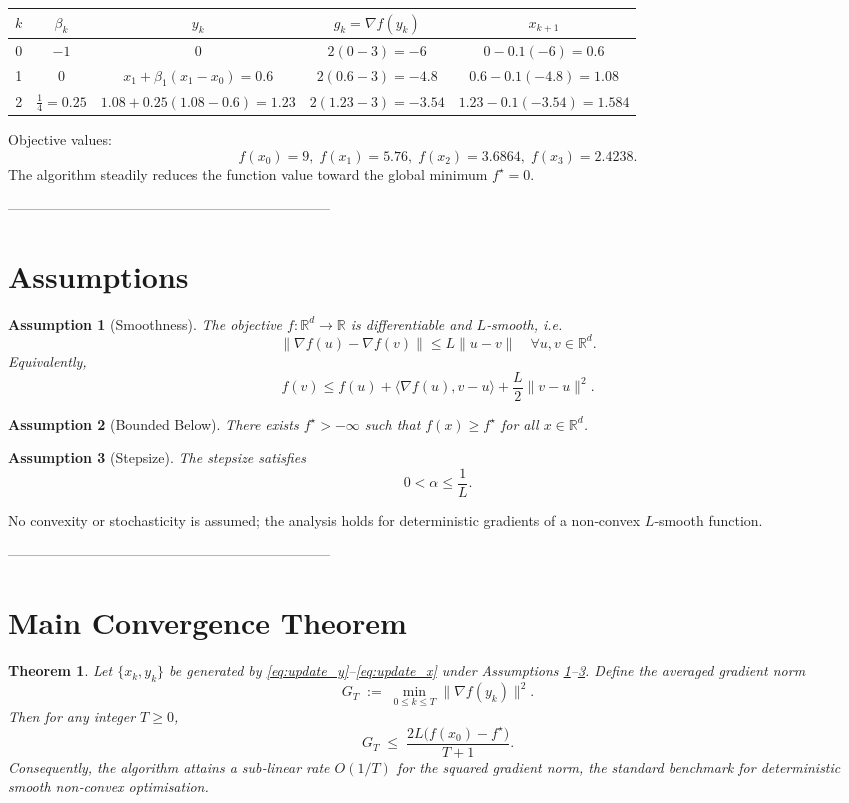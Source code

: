 \documentclass{article}
\newtheorem{theorem}{Theorem}
\newtheorem{assumption}{Assumption}
\newcommand{\grad}{\nabla}
\newcommand{\R}{\mathbb{R}}
\begin{document}
\begin{center}
\begin{tabular}{c|c|c|c|c}
$k$ & $\beta_k$ & $y_k$ & $g_k=\grad f(y_k)$ & $x_{k+1}$ \\ \hline
0 & $-1$ & $0$ & $2(0-3)=-6$ & $0-0.1(-6)=0.6$ \\[4pt]
1 & $0$ & $x_1+\beta_1(x_1-x_0)=0.6$ & $2(0.6-3)=-4.8$ & $0.6-0.1(-4.8)=1.08$ \\[4pt]
2 & $\frac{1}{4}=0.25$ & $1.08+0.25(1.08-0.6)=1.23$ & $2(1.23-3)=-3.54$ & $1.23-0.1(-3.54)=1.584$ 
\end{tabular}
\end{center}

Objective values:
\[
f(x_0)=9,\; f(x_1)=5.76,\; f(x_2)=3.6864,\; f(x_3)=2.4238.
\]
The algorithm steadily reduces the function value toward the global minimum $f^\star=0$.

---------------------------------------------------------------------

\section*{Assumptions}
\begin{assumption}[Smoothness]\label{ass:smooth}
The objective $f:\R^d\to\R$ is differentiable and $L$‑smooth, i.e.
\[
\|\grad f(u)-\grad f(v)\|\le L\|u-v\|\quad\forall u,v\in\R^d.
\]
Equivalently,
\[
f(v)\le f(u)+\langle\grad f(u),v-u\rangle+\frac{L}{2}\|v-u\|^2.
\tag{S}
\]
\end{assumption}

\begin{assumption}[Bounded Below]\label{ass:lower}
There exists $f^\star>-\infty$ such that $f(x)\ge f^\star$ for all $x\in\R^d$.
\end{assumption}

\begin{assumption}[Stepsize]\label{ass:stepsize}
The stepsize satisfies
\[
0<\alpha\le \frac{1}{L}.
\]
\end{assumption}

No convexity or stochasticity is assumed; the analysis holds for deterministic gradients of a non‑convex $L$‑smooth function.

---------------------------------------------------------------------

\section*{Main Convergence Theorem}
\begin{theorem}\label{thm:main}
Let $\{x_k,y_k\}$ be generated by \eqref{eq:update_y}–\eqref{eq:update_x} under Assumptions \ref{ass:smooth}–\ref{ass:stepsize}.  
Define the averaged gradient norm
\[
G_T \;:=\; \min_{0\le k\le T}\bigl\|\grad f(y_k)\bigr\|^2 .
\]
Then for any integer $T\ge 0$,
\[
G_T\;\le\; \frac{2L\bigl(f(x_0)-f^\star\bigr)}{T+1}.
\tag{1}
\]
Consequently, the algorithm attains a \emph{sub‑linear} rate $O(1/T)$ for the squared gradient norm, the standard benchmark for deterministic smooth non‑convex optimisation.
\end{theorem}
\end{document}
